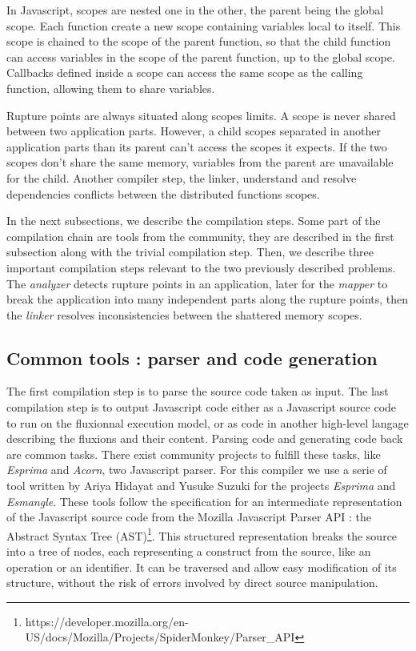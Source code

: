 In Javascript, scopes are nested one in the other, the parent being the global scope.
Each function create a new scope containing variables local to itself.
This scope is chained to the scope of the parent function, so that the child function can access variables in the scope of the parent function, up to the global scope.
Callbacks defined inside a scope can access the same scope as the calling function, allowing them to share variables.

Rupture points are always situated along scopes limits.
A scope is never shared between two application parts.
However, a child scopes separated in another application parts than its parent can't access the scopes it expects.
If the two scopes don't share the same memory, variables from the parent are unavailable for the child.
Another compiler step, the linker, understand and resolve dependencies conflicts between the distributed functions scopes.

In the next subsections, we describe the compilation steps.
Some part of the compilation chain are tools from the community, they are described in the first subsection along with the trivial compilation step.
Then, we describe three important compilation steps relevant to the two previously described problems.
The \textit{analyzer} detects rupture points in an application, later for the \textit{mapper} to break the application into many independent parts along the rupture points, then the \textit{linker} resolves inconsistencies between the shattered memory scopes.

\subsection{Common tools : parser and code generation}

The first compilation step is to parse the source code taken as input.
The last compilation step is to output Javascript code either as a Javascript source code to run on the fluxionnal execution model, or as code in another high-level langage describing the fluxions and their content.
Parsing code and generating code back are common tasks.
There exist community projects to fulfill these tasks, like \textit{Esprima} and \textit{Acorn}, two Javascript parser.
For this compiler we use a serie of tool written by Ariya Hidayat and Yusuke Suzuki for the projects \textit{Esprima} and \textit{Esmangle}.
These tools follow the specification for an intermediate representation of the Javascript source code from the Mozilla Javascript Parser API : the Abstract Syntax Tree (AST)\footnote{\raggedright https://developer.mozilla.org/en-US/docs/Mozilla/Projects/SpiderMonkey/Parser\_API}.
This structured representation breaks the source into a tree of nodes, each representing a construct from the source, like an operation or an identifier.
It can be traversed and allow easy modification of its structure, without the risk of errors involved by direct source manipulation.

